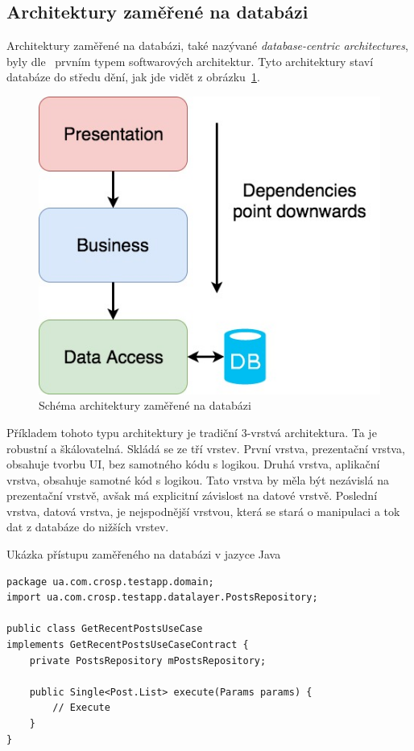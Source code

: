 \subsection{Architektury zaměřené na databázi}

Architektury zaměřené na databázi,
také nazývané \emph{database-centric architectures},
byly dle~\cite{architecture} prvním typem softwarových architektur.
Tyto architektury staví databáze do středu dění,
jak jde vidět z obrázku~\ref{fig:architecture_database}.

\begin{figure}
    \centering
    \includegraphics[width=0.5\linewidth]{assets/technology-research/architecture/database-centric.jpg}
    \caption{Schéma architektury zaměřené na databázi ~\cite{architecture}}
    \label{fig:architecture_database}
\end{figure}

Příkladem tohoto typu architektury je tradiční 3-vrstvá architektura.
Ta je robustní a škálovatelná.
Skládá se ze tří vrstev.
První vrstva,
prezentační vrstva,
obsahuje tvorbu UI,
bez samotného kódu s logikou.
Druhá vrstva,
aplikační vrstva,
obsahuje samotné kód s logikou.
Tato vrstva by měla být nezávislá na prezentační vrstvě,
avšak má explicitní závislost na datové vrstvě.
Poslední vrstva,
datová vrstva,
je nejspodnější vrstvou,
která se stará o manipulaci a tok dat z databáze do nižších vrstev.
\cite{architecture}

\begin{listing}
    \caption{Ukázka přístupu zaměřeného na databázi v jazyce Java~\cite{architecture}}
    \label{code:architecture-database}
    \begin{verbatim}
package ua.com.crosp.testapp.domain;
import ua.com.crosp.testapp.datalayer.PostsRepository;

public class GetRecentPostsUseCase
implements GetRecentPostsUseCaseContract {
    private PostsRepository mPostsRepository;

    public Single<Post.List> execute(Params params) {
        // Execute
    }
}
    \end{verbatim}
\end{listing}

